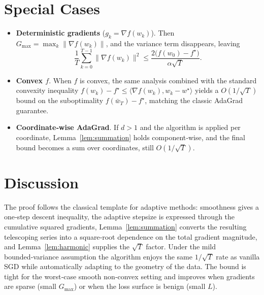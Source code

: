 \documentclass{article}
\begin{document}
\section*{Special Cases}
\begin{itemize}
\item \textbf{Deterministic gradients} ($g_k=\nabla f(w_k)$).  
Then $G_{\max}= \max_k\|\nabla f(w_k)\|$, and the variance term disappears, leaving
\[
\frac{1}{T}\sum_{k=0}^{T-1}\|\nabla f(w_k)\|^{2}
\le \frac{2\big(f(w_0)-f^{\star}\big)}{\alpha\sqrt{T}} .
\]

\item \textbf{Convex $f$}.  
When $f$ is convex, the same analysis combined with the standard convexity inequality
$f(w_k)-f^{\star}\le\langle\nabla f(w_k), w_k-w^{\star}\rangle$ yields a $O(1/\sqrt{T})$ bound on the suboptimality $f(\bar w_T)-f^{\star}$, matching the classic AdaGrad guarantee.

\item \textbf{Coordinate‑wise AdaGrad}.  
If $d>1$ and the algorithm is applied per coordinate, Lemma~\ref{lem:summation} holds component‑wise, and the final bound becomes a sum over coordinates, still $O(1/\sqrt{T})$.
\end{itemize}

\section*{Discussion}
The proof follows the classical template for adaptive methods: smoothness gives a one‑step descent inequality, the adaptive stepsize is expressed through the cumulative squared gradients, Lemma~\ref{lem:summation} converts the resulting telescoping series into a square‑root dependence on the total gradient magnitude, and Lemma~\ref{lem:harmonic} supplies the $\sqrt{T}$ factor. Under the mild bounded‑variance assumption the algorithm enjoys the same $1/\sqrt{T}$ rate as vanilla SGD while automatically adapting to the geometry of the data. The bound is tight for the worst‑case smooth non‑convex setting and improves when gradients are sparse (small $G_{\max}$) or when the loss surface is benign (small $L$).
\end{document}
